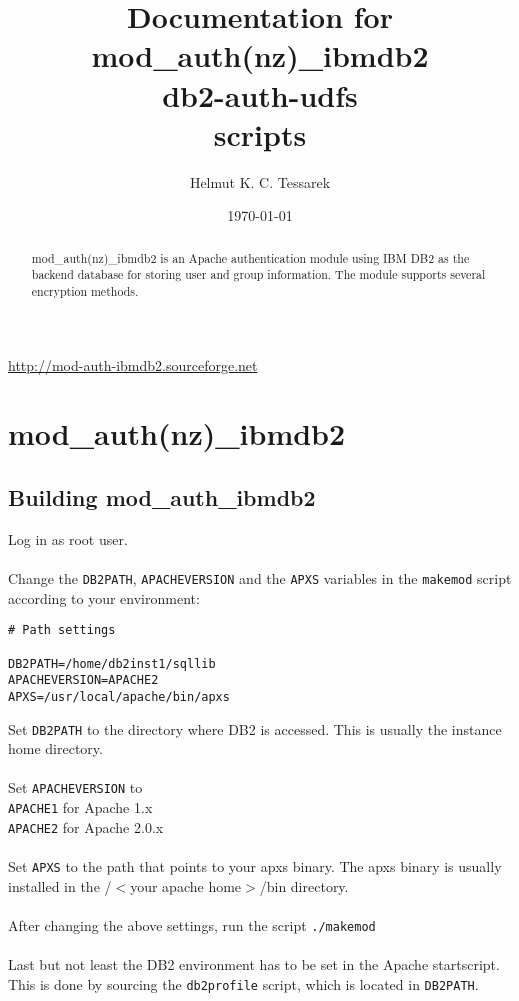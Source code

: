 \documentclass[11pt,a4paper]{article}
\date{\today}
\author{Helmut K. C. Tessarek}
\title{Documentation for\\
mod\_auth(nz)\_ibmdb2\\
db2-auth-udfs\\
scripts}
\begin{document}
\maketitle
\setcounter{page}{0}
\thispagestyle{empty}
\begin{abstract}
mod\_auth(nz)\_ibmdb2 is an Apache authentication module using IBM\textsuperscript{\textregistered}{} DB2\textsuperscript{\textregistered}{} as the backend database for storing user and group information. The module supports several encryption methods.
\end{abstract}

\vfill

\begin{center}
\href{http://mod-auth-ibmdb2.sourceforge.net}{http://mod-auth-ibmdb2.sourceforge.net}
\end{center}
\newpage
\renewcommand{\thepage}{\roman{page}}
\tableofcontents
\newpage
\renewcommand{\thepage}{\arabic{page}}
\setcounter{page}{1}
\section{mod\_auth(nz)\_ibmdb2}

\subsection{Building mod\_auth\_ibmdb2}
Log in as root user.\\
\\
Change the {\tt DB2PATH}, {\tt APACHEVERSION} and the {\tt APXS} variables
in the {\tt makemod} script according to your environment:
\begin{verbatim}
# Path settings

DB2PATH=/home/db2inst1/sqllib
APACHEVERSION=APACHE2
APXS=/usr/local/apache/bin/apxs
\end{verbatim}
Set {\tt DB2PATH} to the directory where DB2 is accessed. This is usually the instance home directory.\\
\\
Set {\tt APACHEVERSION} to\\
\hspace*{5ex} {\tt APACHE1} for Apache 1.x\\
\hspace*{5ex} {\tt APACHE2} for Apache 2.0.x\\
\\
Set {\tt APXS} to the path that points to your apxs binary. The apxs binary is usually installed in the /$<$your apache home$>$/bin directory.\\
\\
After changing the above settings, run the script {\tt ./makemod}\\
\\
Last but not least the DB2 environment has to be set in the Apache startscript. This is done by sourcing the {\tt db2profile} script, which is located in {\tt DB2PATH}.\\
\end{document}
